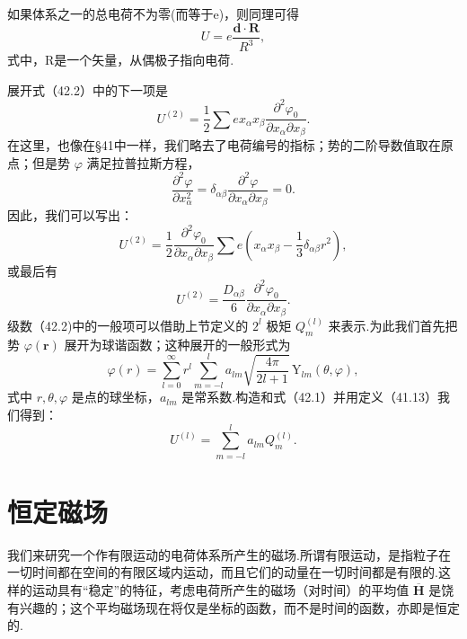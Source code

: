如果体系之一的总电荷不为零(而等于e)，则同理可得
\begin{equation}
  U=e\frac{\boldsymbol{d}\cdot\boldsymbol{R}}{R^3},
\end{equation}
式中，R是一个矢量，从偶极子指向电荷.

展开式（42.2）中的下一项是
\begin{equation*}
  U^{(2)}=\frac{1}{2}\sum ex_\alpha x_\beta
  \frac{\partial^2\varphi_0}{\partial x_\alpha\partial x_\beta}.
\end{equation*}
在这里，也像在§41中一样，我们略去了电荷编号的指标；势的二阶导数值取在原点；但是势 $\varphi$ 满足拉普拉斯方程，
\begin{equation*}
  \frac{\partial^2\varphi}{\partial x_\alpha^2}
  =\delta_{\alpha\beta}\frac{\partial^2\varphi}{\partial x_\alpha\partial x_\beta}=0.
\end{equation*}
因此，我们可以写出：
\begin{equation*}
  U^{(2)}=\frac{1}{2}\frac{\partial^2\varphi_0}{\partial x_\alpha\partial x_\beta}
  \sum e\left(x_\alpha x_\beta-\frac{1}{3}\delta_{\alpha\beta}r^2\right),
\end{equation*}
或最后有
\begin{equation}
  U^{(2)}=\frac{D_{\alpha\beta}}{6}
  \frac{\partial^2\varphi_0}{\partial x_\alpha\partial x_\beta}.
\end{equation}
级数（42.2)中的一般项可以借助上节定义的 $2^l$ 极矩 $Q_m^{(l)}$ 来表示.为此我们首先把势 $\varphi(\boldsymbol{r})$ 展开为球谐函数；这种展开的一般形式为
\begin{equation}
  \varphi(r)=\sum_{l=0}^{\infty}r^l\sum_{m=-l}^{l}a_{lm}
  \sqrt{\frac{4\pi}{2l+1}}\,\mathrm{Y}_{lm}(\theta,\varphi),
\end{equation}
式中 $r,\theta,\varphi$ 是点的球坐标，$a_{lm}$ 是常系数.构造和式（42.1）并用定义（41.13）我们得到：
\begin{equation}
  U^{(l)}=\sum_{m=-l}^{l}a_{lm}Q_m^{(l)}.
\end{equation}

\section{恒定磁场}

我们来研究一个作有限运动的电荷体系所产生的磁场.所谓有限运动，是指粒子在一切时间都在空间的有限区域内运动，而且它们的动量在一切时间都是有限的.这样的运动具有“稳定”的特征，考虑电荷所产生的磁场（对时间）的平均值 $\overline{\boldsymbol{H}}$ 是饶有兴趣的；这个平均磁场现在将仅是坐标的函数，而不是时间的函数，亦即是恒定的.

